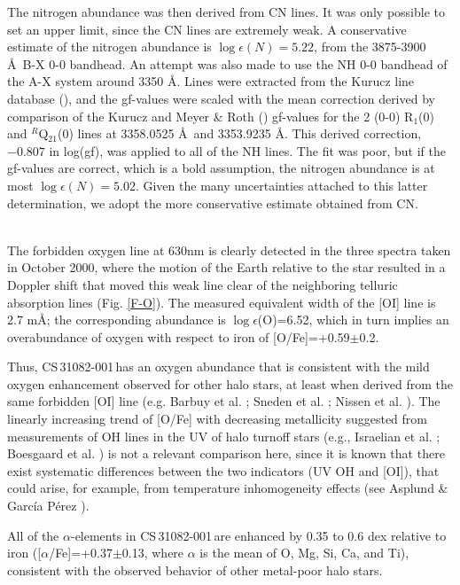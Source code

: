 \documentclass{aa}
\def\cs{CS\,31082-001\,}
\begin{document}
The nitrogen abundance was then derived from CN lines. It was only possible to
set an upper limit, since the CN lines are extremely weak. A conservative estimate
of the nitrogen abundance is $\log \epsilon (N)= 5.22$, from the 3875-3900 \AA\
B-X 0-0 bandhead. An attempt was also made to use the NH 0-0 bandhead of the A-X
system around 3350 \AA. Lines were extracted from the Kurucz line database
(\cite{kuruczcd}), and the gf-values were scaled with the mean correction
derived by comparison of the Kurucz and Meyer \& Roth (\cite{meyer}) gf-values
for the 2 (0-0) R$_1$(0) and $^R$Q$_{21}$(0) lines at 3358.0525 \AA\  and
3353.9235 \AA. This derived correction, $-0.807$ in log(gf), was applied to all
of the NH lines.  The fit was poor, but if the gf-values are correct,
which is a bold assumption, the nitrogen abundance is at most $\log \epsilon
(N)= 5.02$. Given the many uncertainties attached to this latter determination,
we adopt the more conservative estimate obtained from CN.

\\
The forbidden oxygen line at 630nm is clearly detected in the three spectra
taken in October 2000, where the motion of the Earth relative to the star
resulted in a Doppler shift that moved this weak line clear of the 
neighboring telluric absorption lines (Fig. \ref{F-O}). The measured
equivalent width of the [OI] line is 2.7 m\AA; the corresponding 
abundance is $\log \epsilon$(O)=6.52, which in turn 
implies an overabundance of oxygen with respect
to iron of [O/Fe]=+0.59$\pm$0.2.  

Thus, \cs has an oxygen abundance that
is consistent with the mild oxygen enhancement observed for other halo stars,
at least when derived from the same forbidden [OI] line (e.g.  Barbuy et al.
\cite{barbuy88}; Sneden et al. \cite{sneden01}; Nissen et al. \cite{nissen01}).
The linearly increasing trend of [O/Fe] with decreasing metallicity suggested
from measurements of OH lines in the UV of halo turnoff stars (e.g., Israelian
et al. \cite{israelian98}; Boesgaard et al. \cite{boesgaard99}) is not a
relevant comparison here, since it is known that there exist systematic
differences between the two indicators (UV OH and [OI]), that could arise, for
example, from temperature inhomogeneity effects (see Asplund \& Garc\'ia
P\'erez \cite{asplund01}).

All of the $\alpha$-elements in \cs are enhanced by 0.35 to 0.6 dex
relative to iron ([$\alpha$/Fe]=+0.37$\pm$0.13, 
where $\alpha$ is the mean of O, Mg, Si, Ca, and Ti),
consistent with the observed behavior of other metal-poor halo stars.
\end{document}
